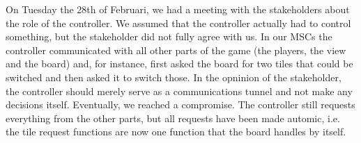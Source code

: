 On Tuesday the 28th of Februari, we had a meeting with the stakeholders about the role of the controller. We assumed that the controller actually had to control something, but the stakeholder did not fully agree with us. In our MSCs the controller communicated with all other parts of the game (the players, the view and the board) and, for instance, first asked the board for two tiles that could be switched and then asked it to switch those. In the opninion of the stakeholder, the controller should merely serve as a communications tunnel and not make any decisions itself. Eventually, we reached a compromise. The controller still requests everything from the other parts, but all requests have been made automic, i.e. the tile request functions are now one function that the board handles by itself.
